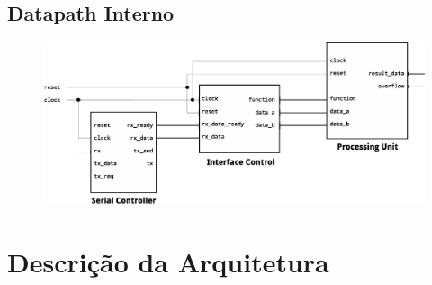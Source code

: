 \documentclass{report}
\begin{document}
  \section{Datapath Interno}
    \begin{figure}[H]
      \centering
      \includegraphics[width=\linewidth]{datapath/ip_datapath.eps}
    \end{figure}

\chapter{Descrição da Arquitetura}

	
	
	
	
	\newpage
	
	

	

% 
% 
\end{document}
